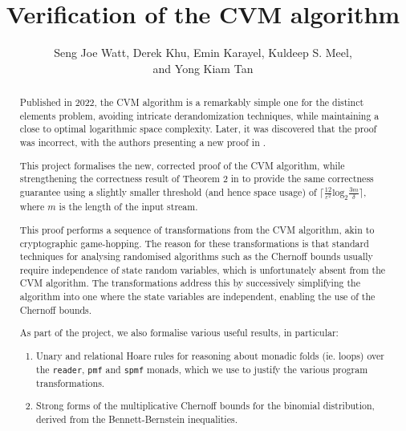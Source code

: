 \documentclass[11pt, a4paper]{report}
\begin{document}
\title{Verification of the CVM algorithm}

\author{
  Seng Joe Watt,
  Derek Khu,
  Emin Karayel,
  Kuldeep S. Meel,
  \\
  and Yong Kiam Tan
}

\maketitle

\begin{abstract}
  Published in 2022, the CVM algorithm \cite{cvm_2022} is a remarkably simple
  one for the distinct elements problem, avoiding intricate derandomization
  techniques, while maintaining a close to optimal logarithmic space complexity.
  Later, it was discovered that the proof was incorrect, with the authors
  presenting a new proof in \cite{cvm_2023}.

  This project formalises the new, corrected proof of the CVM algorithm, while
  strengthening the correctness result of Theorem 2 in \cite{cvm_2023} to provide
  the same correctness guarantee using a slightly smaller threshold
  (and hence space usage) of
  $\lceil \frac{12}{\varepsilon^2} \text{log}_2 \frac{3m}{\delta} \rceil$,
  where $m$ is the length of the input stream.

  This proof performs a sequence of transformations from the CVM algorithm,
  akin to cryptographic game-hopping.  The reason for these transformations is
  that standard techniques for analysing randomised algorithms such as the
  Chernoff bounds usually require independence of state random variables, which
  is unfortunately absent from the CVM algorithm.  The transformations address
  this by successively simplifying the algorithm into one where the state
  variables are independent, enabling the use of the Chernoff bounds.

  As part of the project, we also formalise various useful results, in particular:
  \begin{enumerate}
    \item Unary and relational Hoare rules for reasoning about monadic folds
    (ie. loops) over the \texttt{reader}, \texttt{pmf} and \texttt{spmf} monads,
    which we use to justify the various program transformations.

    \item Strong forms of the multiplicative Chernoff bounds for the binomial
    distribution, derived from the Bennett-Bernstein inequalities.
  \end{enumerate}
\end{abstract}
\end{document}
